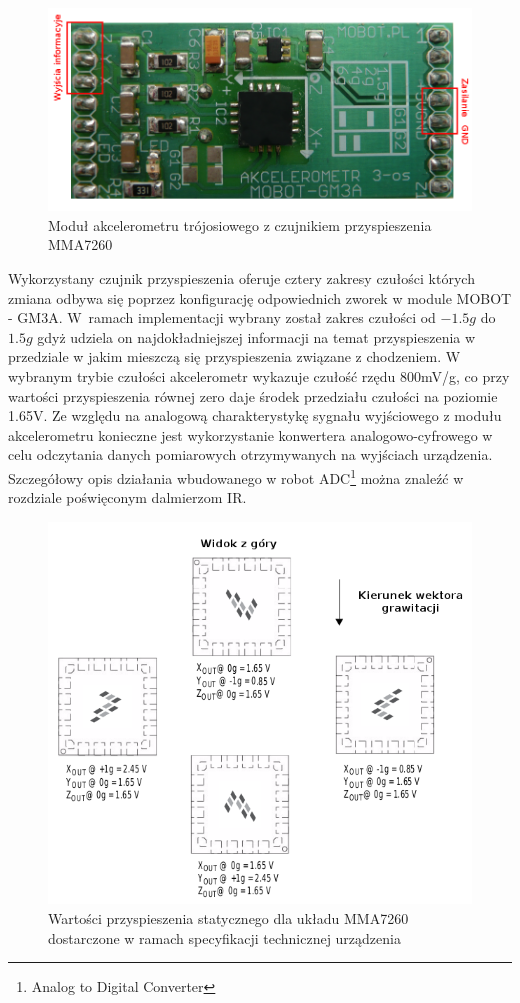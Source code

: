 \begin{figure}[ht!]
 \centering
 \includegraphics[width=\textwidth]{../images/ch04/gm3a_view.png}
 \caption{Moduł akcelerometru trójosiowego z czujnikiem przyspieszenia MMA7260}
 \label{fig:AccView}
\end{figure}
\newpage
Wykorzystany czujnik przyspieszenia oferuje cztery zakresy czułości których
zmiana odbywa się poprzez konfigurację odpowiednich zworek w module MOBOT -
GM3A. W~ramach implementacji wybrany został zakres czułości od $-1.5g$ do $1.5g$ gdyż
udziela on najdokładniejszej informacji na temat przyspieszenia w przedziale w
jakim mieszczą się przyspieszenia związane z chodzeniem. W wybranym trybie
czułości akcelerometr wykazuje czułość rzędu 800mV/g, co przy wartości
przyspieszenia równej zero daje środek przedziału czułości na poziomie 1.65V.
Ze względu na analogową charakterystykę sygnału wyjściowego z modułu
akcelerometru konieczne jest wykorzystanie konwertera analogowo-cyfrowego w
celu odczytania danych pomiarowych otrzymywanych na wyjściach urządzenia.
Szczegółowy opis działania wbudowanego w robot ADC\footnote{Analog to Digital
Converter} można znaleźć w rozdziale poświęconym dalmierzom IR. 

\begin{figure}[ht!]
 \centering
 \includegraphics[width=\textwidth]{../images/ch04/mma7260_datasheet.png}
 \caption{Wartości przyspieszenia statycznego dla układu MMA7260 dostarczone w
 ramach specyfikacji technicznej urządzenia\cite{MMA7260DataSheet}}
 \label{fig:MMADataSheetStaticAcc}
\end{figure}

